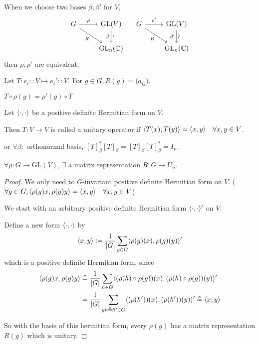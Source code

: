 \begin{remark}
  When we choose two bases $\beta, \beta'$ for $V$,
  \[
    \begin{tikzcd}
      G \arrow{r}{\rho} \arrow[swap]{dr}{R} & \text{GL}(V) \arrow[d, "\beta"', "\rotatebox{90}{\(\sim\)}"] \\
                                            & \text{GL}_n(\Cb)
    \end{tikzcd} \quad
    \begin{tikzcd}
      G \arrow{r}{\rho'} \arrow[swap]{dr}{R} & \text{GL}(V) \arrow[d, "\beta'"', "\rotatebox{90}{\(\sim\)}"] \\
                                            & \text{GL}_n(\Cb)
    \end{tikzcd}
  \]
  then $\rho, \rho'$ are equivalent.
\end{remark}

Let $T: e_i :: V \mapsto e_i' :: V$. For $g \in G, R(g) = \big(a_{ij}\big)$.

$T \circ \rho(g) = \rho'(g) \circ T$

\begin{definition}
  Let $\langle\cdot, \cdot\rangle$ be a positive definite Hermitian form on $V$.

  Then $T: V \to V$ is called a unitary operator if
  $\langle T(x), T(y)\rangle = \langle x, y\rangle \quad \forall x, y \in V$.

  or $\forall \beta:$ orthonormal basis,
  $[T]_\beta^*[T]_\beta = [T]_\beta[T]_\beta^* = I_n$.
\end{definition}

\begin{theorem}
  $\forall \rho: G \to \text{GL}(V)$, $\exists$ a matrix representation
  $R: G \to U_n$.
  \begin{proof}
    We only need to $G$-invariant positive definite Hermitian form on $V$.
    ($\forall g \in G, \langle\rho(g)x, \rho(g)y\rangle = \langle x, y\rangle \quad
  \forall x, y \in V$)

  We start with an arbitrary positive definite Hermitian form
  $\langle\cdot, \cdot\rangle'$ on $V$.

  Define a new form $\langle\cdot, \cdot\rangle$ by
  \[
    \langle x, y\rangle \vcentcolon= \frac{1}{\lvert G\rvert} \sum_{g\in G}
    \langle\rho(g)(x), \rho(g)(y)\rangle'
  \]
  which is a positive definite Hermitian form, since
  \begin{align*}
    \langle\rho(g)x, \rho(g)y\rangle 
    & \triangleq
    \frac{1}{\lvert G\rvert} \sum_{h \in G} \langle(\rho(h) \circ \rho(g))(x),
      (\rho(h) \circ \rho(g))(y)\rangle' \\
    & = 
    \frac{1}{\lvert G\rvert} \sum_{gh \triangleq h' \in G} \langle(\rho(h'))(x),
      (\rho(h'))(y)\rangle' \triangleq \langle x, y\rangle
  \end{align*}

  So with the basis of this hermitian form, every $\rho(g)$ has a matrix representation
  $R(g)$ which is unitary.
  \end{proof}
\end{theorem}

